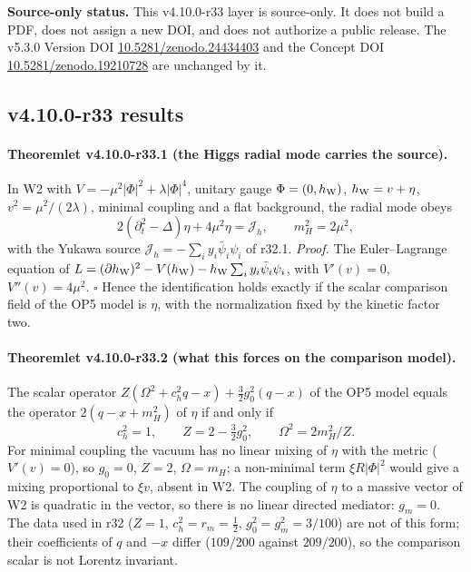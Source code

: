 \noindent\textbf{Source-only status.}
This v4.10.0-r33 layer is source-only.  It does not build a PDF, does not assign a new DOI,
and does not authorize a public release.  The v5.3.0 Version DOI
\href{https://doi.org/10.5281/zenodo.24434403}{10.5281/zenodo.24434403} and the Concept DOI
\href{https://doi.org/10.5281/zenodo.19210728}{10.5281/zenodo.19210728} are unchanged by it.

\subsection*{v4.10.0-r33 results}
\label{subsec:v4100-r33-results}

\paragraph{Theoremlet v4.10.0-r33.1 (the Higgs radial mode carries the source).}
In W2 with \(V=-\mu^2|\Phi|^2+\lambda|\Phi|^4\), unitary gauge \(\Phi=(0,h_{\rm W})\), \(h_{\rm W}=v+\eta\), \(v^2=\mu^2/(2\lambda)\), minimal coupling and a flat
background, the radial mode obeys
\[
 2(\partial_t^2-\Delta)\eta+4\mu^2\eta=\mathcal J_h,\qquad m_H^2=2\mu^2,
\]
with the Yukawa source \(\mathcal J_h=-\sum_iy_i\bar\psi_i\psi_i\) of r32.1.  \emph{Proof.} The Euler--Lagrange equation of
\(L=(\partial h_{\rm W})^2-V(h_{\rm W})-h_{\rm W}\sum_iy_i\bar\psi_i\psi_i\), with \(V'(v)=0\), \(V''(v)=4\mu^2\).  \(\square\)
Hence the identification holds exactly if the scalar comparison field of the OP5 model is \(\eta\), with the normalization fixed by the
kinetic factor two.

\paragraph{Theoremlet v4.10.0-r33.2 (what this forces on the comparison model).}
The scalar operator \(Z(\Omega^2+c_h^2q-x)+\tfrac32g_0^2(q-x)\) of the OP5 model equals the operator \(2(q-x+m_H^2)\) of \(\eta\) if and only if
\[
 c_h^2=1,\qquad Z=2-\tfrac32g_0^2,\qquad \Omega^2=2m_H^2/Z .
\]
For minimal coupling the vacuum has no linear mixing of \(\eta\) with the metric (\(V'(v)=0\)), so \(g_0=0\), \(Z=2\), \(\Omega=m_H\); a non-minimal term
\(\xi R|\Phi|^2\) would give a mixing proportional to \(\xi v\), absent in W2.  The coupling of \(\eta\) to a massive vector of W2 is quadratic in the
vector, so there is no linear directed mediator: \(g_m=0\).  The data used in r32 (\(Z=1\), \(c_h^2=r_m=\tfrac12\), \(g_0^2=g_m^2=3/100\)) are not of this
form; their coefficients of \(q\) and \(-x\) differ (\(109/200\) against \(209/200\)), so the comparison scalar is not Lorentz invariant.

